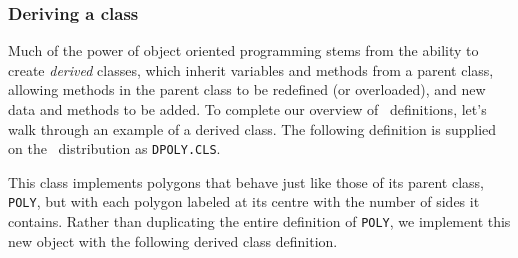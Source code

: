 \documentclass{article}
\begin{document}
\subsubsection{Deriving a class}

Much of the power of object oriented programming stems from the
ability to create {\em derived} classes, which inherit variables and methods
from a parent class, allowing methods in the parent class to be
redefined (or overloaded), and new data and methods to be added.
To complete our overview of \cw\ definitions, let's walk through an
example of a derived class.  The following definition is supplied on
the \cw\ distribution as {\tt DPOLY.CLS}\@.

This class implements polygons that behave just like those of its
parent class, {\tt POLY}, but with each polygon labeled at its centre
with the number of sides it contains.  Rather than duplicating
the entire definition of {\tt POLY}, we implement this new object
with the following derived class definition.
\end{document}
